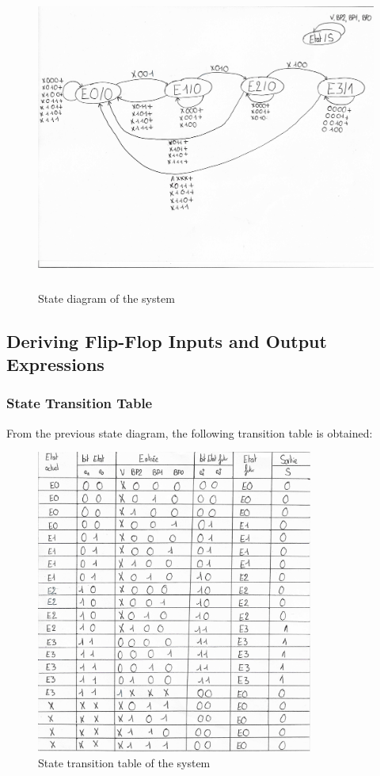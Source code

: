 \begin{figure}[H]
\centering
\includegraphics[height=10cm]{img/graph.jpg}
\caption{State diagram of the system}
\end{figure}

\newpage
\subsection{Deriving Flip-Flop Inputs and Output Expressions}
\subsubsection{State Transition Table}
From the previous state diagram, the following transition table is obtained:

\begin{figure}[H]
\centering
\includegraphics[height=10cm]{img/transition.jpg}
\caption{State transition table of the system}
\end{figure}


